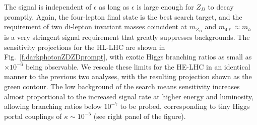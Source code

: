 The signal is independent of $\epsilon$ as long as $\epsilon$ is large enough for $Z_D$ to decay promptly. 
%
Again, the four-lepton final state is the best search target, and the requirement of two di-lepton invariant masses coincident at $m_{Z_D}$ and $m_{4 \ell} \approx m_h$ is a very stringent signal requirement that greatly suppresses backgrounds. 
%
The sensitivity projections for the HL-LHC are shown in Fig.~\ref{f.darkphotonZDZDprompt}, with exotic Higgs branching ratios as small as $\times 10^{-6}$ being observable. 
%
We rescale these limits for the HE-LHC in an identical manner to the previous two analyses, with the resulting projection shown as the green contour. The low background of the search means sensitivity increases almost proportional to the increased signal rate at higher energy and luminosity, allowing branching ratios below $10^{-7}$ to be probed, corresponding to tiny Higgs portal couplings of $\kappa \sim 10^{-5}$ (see right panel of the figure). 


